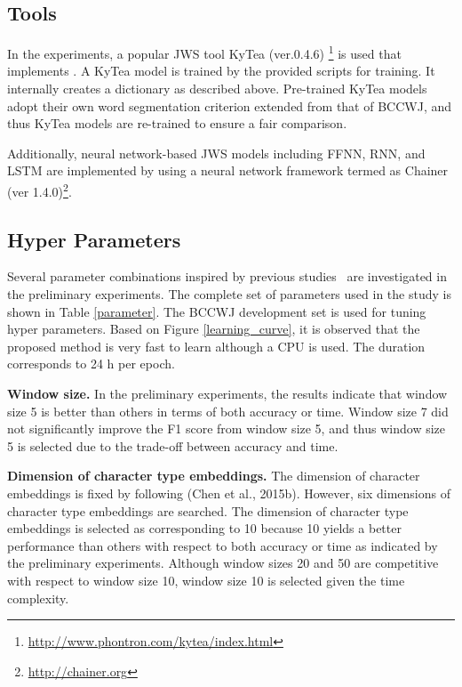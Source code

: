 \documentclass[11pt,letterpaper]{article}
\begin{document}
\subsection{Tools}
In the experiments, a popular JWS tool KyTea (ver.0.4.6) \footnote{\url{http://www.phontron.com/kytea/index.html}} is used that implements \cite{neubig-nakata-mori:2011:ACL-HLT2011}. A KyTea model is trained by the provided scripts for training. It internally creates a dictionary as described above. Pre-trained KyTea models adopt their own word segmentation criterion extended from that of BCCWJ, and thus KyTea models are re-trained to ensure a fair comparison.

Additionally, neural network-based JWS models including FFNN, RNN, and LSTM are implemented by using a neural network framework termed as Chainer (ver 1.4.0)\footnote{\url{http://chainer.org}}\cite{chainerlearningsys2015}. 

\subsection{Hyper Parameters}
Several parameter combinations inspired by previous studies~\cite{chen-EtAl:2015:EMNLP2} are investigated in the preliminary experiments. The complete set of parameters used in the study is shown in Table \ref{parameter}. The BCCWJ development set is used for tuning hyper parameters. Based on Figure \ref{learning_curve}, it is observed that the proposed method is very fast to learn although a CPU is used. The duration corresponds to 24 h per epoch. 

\noindent
{\bf Window size.} In the preliminary experiments, the results indicate that window size 5 is better than others in terms of both accuracy or time. Window size 7 did not significantly improve the F1 score from window size 5, and thus window size 5 is selected due to the trade-off between accuracy and time.

\noindent
{\bf Dimension of character type embeddings.} The dimension of character embeddings is fixed by following (Chen et al., 2015b). However, six dimensions of character type embeddings are searched. 
The dimension of character type embeddings is selected as corresponding to 10 because 10 yields a better performance than others with respect to both accuracy or time as indicated by the preliminary experiments. Although window sizes 20 and 50 are competitive with respect to window size 10, window size 10 is selected given the time complexity.
\end{document}
